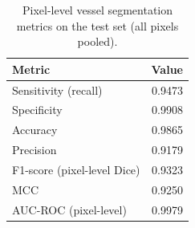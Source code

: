 \begin{table}
\caption{Pixel-level vessel segmentation metrics on the test set (all pixels pooled).}
\label{tab:pixel_level_vessel}
\begin{tabular}{lr}
\toprule
Metric & Value \\
\midrule
Sensitivity (recall) & 0.9473 \\
Specificity & 0.9908 \\
Accuracy & 0.9865 \\
Precision & 0.9179 \\
F1-score (pixel-level Dice) & 0.9323 \\
MCC & 0.9250 \\
AUC-ROC (pixel-level) & 0.9979 \\
\bottomrule
\end{tabular}
\end{table}
